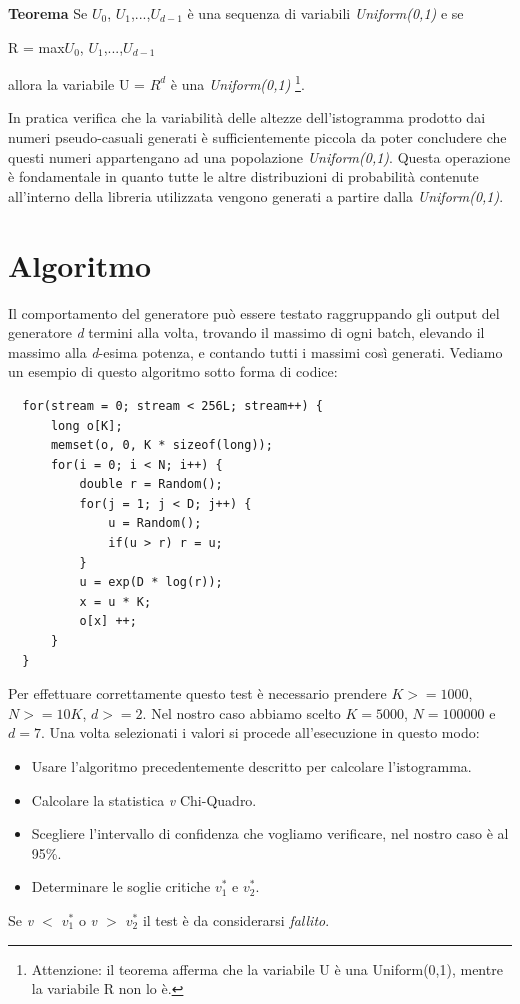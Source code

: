 \vspace{0.5cm} \noindent \textbf{Teorema} Se $U_{0}^{}$, $U_{1}^{}$,...,$U_{d-1}^{}$ è una sequenza di variabili \textit{Uniform(0,1)} e se 

\begin{center}R = max{$U_{0}^{}$, $U_{1}^{}$,...,$U_{d-1}^{}$} \end{center} 

\noindent allora la variabile U = $R_{}^{d}$ è una \textit{Uniform(0,1)} \footnote{Attenzione: il teorema afferma che la variabile U è una Uniform(0,1), mentre la variabile R non lo è.}.

In pratica verifica che la variabilità delle altezze dell'istogramma prodotto dai numeri pseudo-casuali generati è sufficientemente piccola da poter concludere che questi numeri appartengano ad una popolazione \textit{Uniform(0,1)}. Questa operazione è fondamentale in quanto tutte le altre distribuzioni di probabilità contenute all'interno della libreria utilizzata vengono generati a partire dalla \textit{Uniform(0,1)}.

\section{Algoritmo}
Il comportamento del generatore può essere testato raggruppando gli output del generatore \textit{d} termini alla volta, trovando il massimo di ogni batch, elevando il massimo alla \textit{d}-esima potenza, e contando tutti i massimi così generati. Vediamo un esempio di questo algoritmo sotto forma di codice:

\begin{verbatim}
  for(stream = 0; stream < 256L; stream++) {
      long o[K];
      memset(o, 0, K * sizeof(long));
      for(i = 0; i < N; i++) {
          double r = Random();
          for(j = 1; j < D; j++) {
              u = Random();
              if(u > r) r = u;
          }
          u = exp(D * log(r));
          x = u * K;
          o[x] ++;
      }
  }
\end{verbatim}

Per effettuare correttamente questo test è necessario prendere $K >= 1000$, $N >= 10K$, $d >= 2$. Nel nostro caso abbiamo scelto $K = 5000$, $N = 100000$ e $d = 7$. Una volta selezionati i valori si procede all'esecuzione in questo modo:
\begin{itemize}
 \item Usare l'algoritmo precedentemente descritto per calcolare l'istogramma.
 \item Calcolare la statistica \textit{v} Chi-Quadro.
 \item Scegliere l'intervallo di confidenza che vogliamo verificare, nel nostro caso è al 95\%.
 \item Determinare le soglie critiche $v_{1}^{*}$ e $v_{2}^{*}$.
\end{itemize}
Se \textit{v $<$ $v_{1}^{*}$} o \textit{v $>$ $v_{2}^{*}$} il test è da considerarsi \textit{fallito}.

